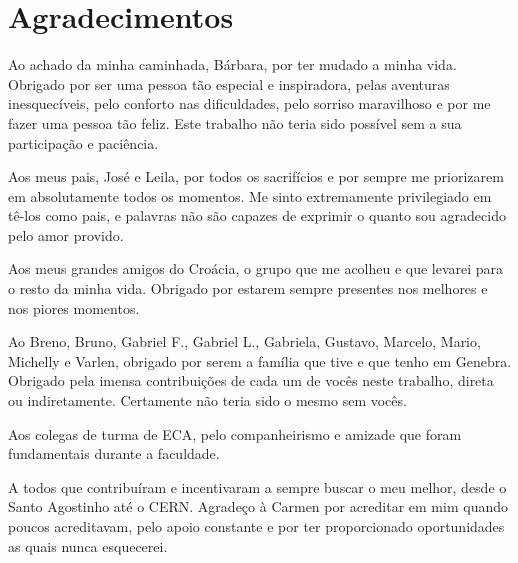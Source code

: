 \chapter*{Agradecimentos}
    
\indent
Ao achado da minha caminhada, Bárbara, por ter mudado a minha vida. Obrigado por ser uma pessoa tão especial e inspiradora, pelas aventuras inesquecíveis, pelo conforto nas dificuldades, pelo sorriso maravilhoso e por me fazer uma pessoa tão feliz. Este trabalho não teria sido possível sem a sua participação e paciência.

Aos meus pais, José e Leila, por todos os sacrifícios e por sempre me priorizarem em absolutamente todos os momentos. Me sinto extremamente privilegiado em tê-los como pais, e palavras não são capazes de exprimir o quanto sou agradecido pelo amor provido.

Aos meus grandes amigos do Croácia, o grupo que me acolheu e que levarei para o resto da minha vida. Obrigado por estarem sempre presentes nos melhores e nos piores momentos.

Ao Breno, Bruno, Gabriel F., Gabriel L., Gabriela, Gustavo, Marcelo, Mario, Michelly e Varlen, obrigado por serem a família que tive e que tenho em Genebra. Obrigado pela imensa contribuições de cada um de vocês neste trabalho, direta ou indiretamente. Certamente não teria sido o mesmo sem vocês.

Aos colegas de turma de ECA, pelo companheirismo e amizade que foram fundamentais durante a faculdade.

A todos que contribuíram e incentivaram a sempre buscar o meu melhor, desde o Santo Agostinho até o CERN. Agradeço à Carmen por acreditar em mim quando poucos acreditavam, pelo apoio constante e por ter proporcionado oportunidades as quais nunca esquecerei.

